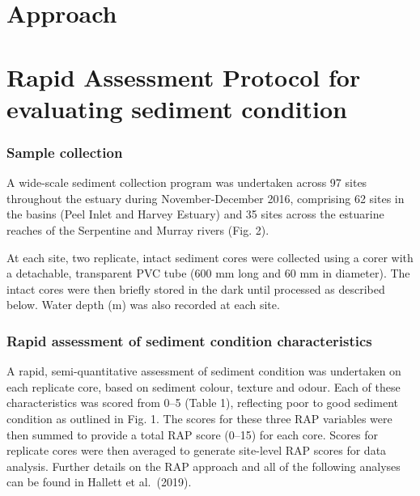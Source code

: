 \documentclass[
]{book}
\begin{document}
\hypertarget{approach-2}{%
\section{Approach}\label{approach-2}}

\hypertarget{rapid-assessment-protocol-for-evaluating-sediment-condition}{%
\section{Rapid Assessment Protocol for evaluating sediment condition}\label{rapid-assessment-protocol-for-evaluating-sediment-condition}}

\hypertarget{sample-collection}{%
\subsubsection{Sample collection}\label{sample-collection}}

A wide-scale sediment collection program was undertaken across 97 sites throughout the estuary during November-December 2016, comprising 62 sites in the basins (Peel Inlet and Harvey Estuary) and 35 sites across the estuarine reaches of the Serpentine and Murray rivers (Fig. 2).

At each site, two replicate, intact sediment cores were collected using a corer with a detachable, transparent PVC tube (600 mm long and 60 mm in diameter). The intact cores were then briefly stored in the dark until processed as described below. Water depth (m) was also recorded at each site.

\hypertarget{rapid-assessment-of-sediment-condition-characteristics}{%
\subsubsection{Rapid assessment of sediment condition characteristics}\label{rapid-assessment-of-sediment-condition-characteristics}}

A rapid, semi-quantitative assessment of sediment condition was undertaken on each replicate core, based on sediment colour, texture and odour. Each of these characteristics was scored from 0--5 (Table 1), reflecting poor to good sediment condition as outlined in Fig. 1. The scores for these three RAP variables were then summed to provide a total RAP score (0--15) for each core. Scores for replicate cores were then averaged to generate site-level RAP scores for data analysis. Further details on the RAP approach and all of the following analyses can be found in Hallett et al.~(2019).
\end{document}
